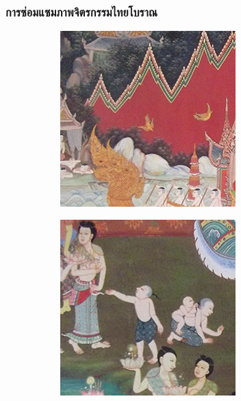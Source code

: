 \documentclass[xcolor=dvipsnames, xetex,serif]{beamer}
\numberwithin{equation}{section}
\begin{document}
    \begin{frame}
        \frametitle{การซ่อมแซมภาพจิตรกรรมไทยโบราณ}
        \begin{figure}[H]
            \centering
            \begin{subfigure}{0.15\linewidth}
                \centering
                \includegraphics[width=0.9\linewidth]{images/thaiart/case01-original.png}
            \end{subfigure}
            \begin{subfigure}{0.15\linewidth}
                \centering
                \includegraphics[width=0.9\linewidth]{images/thaiart/case02-original.png}

\end{subfigure}
\end{figure}
\end{frame}
\end{document}
